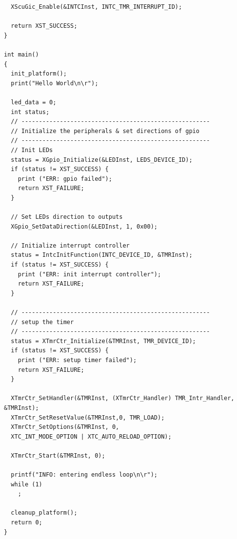 \begin{verbatim}
  XScuGic_Enable(&INTCInst, INTC_TMR_INTERRUPT_ID);

  return XST_SUCCESS;
}

int main()
{
  init_platform();
  print("Hello World\n\r");

  led_data = 0;
  int status;
  // ------------------------------------------------------
  // Initialize the peripherals & set directions of gpio
  // ------------------------------------------------------
  // Init LEDs
  status = XGpio_Initialize(&LEDInst, LEDS_DEVICE_ID);
  if (status != XST_SUCCESS) {
    print ("ERR: gpio failed");
    return XST_FAILURE;
  }

  // Set LEDs direction to outputs
  XGpio_SetDataDirection(&LEDInst, 1, 0x00);

  // Initialize interrupt controller
  status = IntcInitFunction(INTC_DEVICE_ID, &TMRInst);
  if (status != XST_SUCCESS) {
    print ("ERR: init interrupt controller");
    return XST_FAILURE;
  }

  // ------------------------------------------------------
  // setup the timer
  // ------------------------------------------------------
  status = XTmrCtr_Initialize(&TMRInst, TMR_DEVICE_ID);
  if (status != XST_SUCCESS) {
    print ("ERR: setup timer failed");
    return XST_FAILURE;
  }

  XTmrCtr_SetHandler(&TMRInst, (XTmrCtr_Handler) TMR_Intr_Handler, &TMRInst);
  XTmrCtr_SetResetValue(&TMRInst,0, TMR_LOAD);
  XTmrCtr_SetOptions(&TMRInst, 0,
  XTC_INT_MODE_OPTION | XTC_AUTO_RELOAD_OPTION);

  XTmrCtr_Start(&TMRInst, 0);

  printf("INFO: entering endless loop\n\r");
  while (1)
    ;

  cleanup_platform();
  return 0;
}
\end{verbatim}